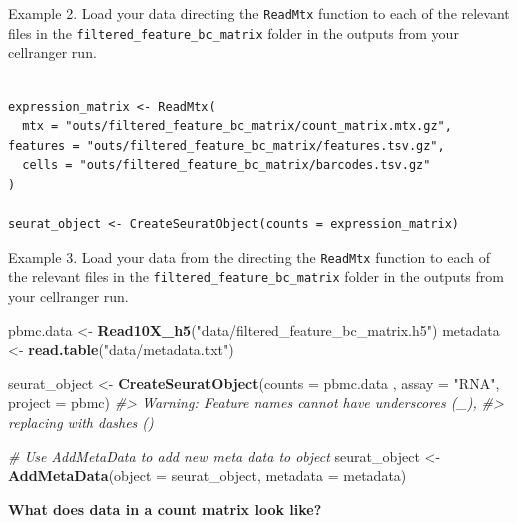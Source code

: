 \documentclass[
]{book}
\newenvironment{Shaded}{\begin{snugshade}}{\end{snugshade}}
\newcommand{\AttributeTok}[1]{\textcolor[rgb]{0.13,0.29,0.53}{#1}}
\newcommand{\CommentTok}[1]{\textcolor[rgb]{0.56,0.35,0.01}{\textit{#1}}}
\newcommand{\FunctionTok}[1]{\textcolor[rgb]{0.13,0.29,0.53}{\textbf{#1}}}
\newcommand{\NormalTok}[1]{#1}
\newcommand{\OtherTok}[1]{\textcolor[rgb]{0.56,0.35,0.01}{#1}}
\newcommand{\StringTok}[1]{\textcolor[rgb]{0.31,0.60,0.02}{#1}}
\begin{document}
Example 2. Load your data directing the \texttt{ReadMtx} function to each of the relevant files in the \texttt{filtered\_feature\_bc\_matrix} folder in the outputs from your cellranger run.

\begin{verbatim}

expression_matrix <- ReadMtx(
  mtx = "outs/filtered_feature_bc_matrix/count_matrix.mtx.gz", features = "outs/filtered_feature_bc_matrix/features.tsv.gz",
  cells = "outs/filtered_feature_bc_matrix/barcodes.tsv.gz"
)

seurat_object <- CreateSeuratObject(counts = expression_matrix)
\end{verbatim}

Example 3. Load your data from the directing the \texttt{ReadMtx} function to each of the relevant files in the \texttt{filtered\_feature\_bc\_matrix} folder in the outputs from your cellranger run.

\begin{Shaded}
\begin{Highlighting}[]
\NormalTok{pbmc.data }\OtherTok{\textless{}{-}} \FunctionTok{Read10X\_h5}\NormalTok{(}\StringTok{"data/filtered\_feature\_bc\_matrix.h5"}\NormalTok{)}
\NormalTok{metadata }\OtherTok{\textless{}{-}} \FunctionTok{read.table}\NormalTok{(}\StringTok{"data/metadata.txt"}\NormalTok{)}

  
  
\NormalTok{seurat\_object }\OtherTok{\textless{}{-}} \FunctionTok{CreateSeuratObject}\NormalTok{(}\AttributeTok{counts =}\NormalTok{ pbmc.data ,}
                                 \AttributeTok{assay =} \StringTok{"RNA"}\NormalTok{, }\AttributeTok{project =} \StringTok{\textquotesingle{}pbmc\textquotesingle{}}\NormalTok{)}
\CommentTok{\#\textgreater{} Warning: Feature names cannot have underscores (\textquotesingle{}\_\textquotesingle{}),}
\CommentTok{\#\textgreater{} replacing with dashes (\textquotesingle{}{-}\textquotesingle{})}



\CommentTok{\# Use AddMetaData to add new meta data to object}
\NormalTok{seurat\_object  }\OtherTok{\textless{}{-}} \FunctionTok{AddMetaData}\NormalTok{(}\AttributeTok{object =}\NormalTok{ seurat\_object, }\AttributeTok{metadata =}\NormalTok{ metadata)}
\end{Highlighting}
\end{Shaded}

\textbf{What does data in a count matrix look like?}
\end{document}
